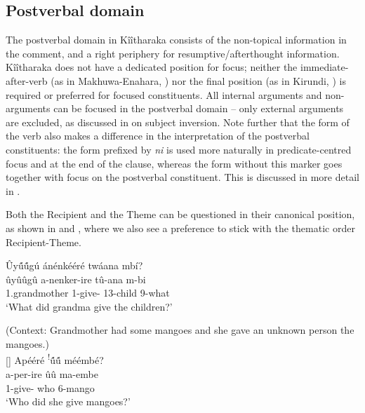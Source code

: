 \documentclass[output=paper]{langscibook}
\begin{document}
\subsection{Postverbal domain}
\label{bkm:Ref115857994}\label{bkm:Ref115798057}
The postverbal domain in Kîîtharaka consists of the non-topical information in the comment, and a right periphery for resumptive/afterthought information. Kîîtharaka does not have a dedicated position for focus; neither the immediate-after-verb (as in Makhuwa-Enahara, \cite{chapters/makhuwa}) nor the final position (as in Kirundi, \cite{chapters/kirundi}) is required or preferred for focused constituents. All internal arguments and non-arguments can be focused in the postverbal domain – only external arguments are excluded, as discussed in  on subject inversion. Note further that the form of the verb also makes a difference in the interpretation of the postverbal constituents: the form prefixed by \textit{ni} is used more naturally in predicate-centred focus and at the end of the clause, whereas the form without this marker goes together with focus on the postverbal constituent. This is discussed in more detail in .


Both the Recipient and the Theme can be questioned in their canonical position, as shown in  and , where we also see a preference to stick with the thematic order Recipient-Theme.


\ea
\label{bkm:Ref88333429}
Ûy\'{û}\'{û}gú ánénkééré twáana mbí?\\
\gll
ûyûûgû  a-nenker-ire  tû-ana  m-bi\\
1.grandmother 1\SM{}-give-\PFV{} 13-child  9-what \\
\glt
‘What did grandma give the children?’

\z

\ea
\label{bkm:Ref89972047}
(Context: Grandmother had some mangoes and she gave an unknown person the mangoes.)\\
\ea
[]{
Apééré \textsuperscript{!}\'{û}\'{û} méémbé?\\
\gll
a-per-ire  ûû  ma-embe\\
1\SM{}-give-\PFV{} who  6-mango \\
\glt
‘Who did she give mangoes?’
}
\end{document}

